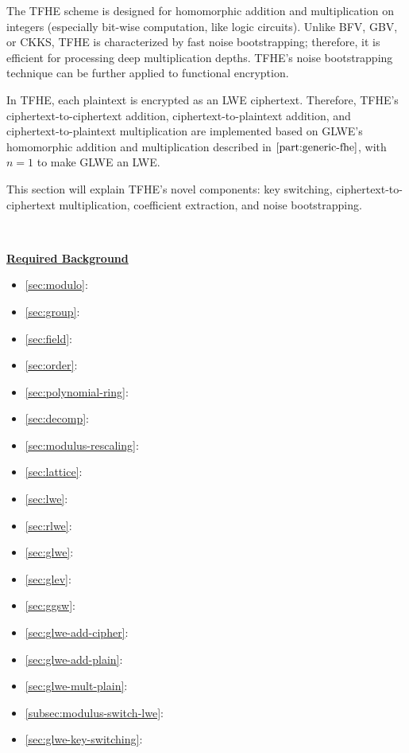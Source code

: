 
The TFHE scheme is designed for homomorphic addition and multiplication on integers (especially bit-wise computation, like logic circuits). Unlike BFV, GBV, or CKKS, TFHE is characterized by fast noise bootstrapping; therefore, it is efficient for processing deep multiplication depths. TFHE's noise bootstrapping technique can be further applied to functional encryption.

In TFHE, each plaintext is encrypted as an LWE ciphertext. Therefore, TFHE's ciphertext-to-ciphertext addition, ciphertext-to-plaintext addition, and ciphertext-to-plaintext multiplication are implemented based on GLWE's homomorphic addition and multiplication described in $\autoref{part:generic-fhe}$, with $n = 1$ to make GLWE an LWE.

This section will explain TFHE's novel components: key switching, ciphertext-to-ciphertext multiplication, coefficient extraction, and noise bootstrapping. 

$ $

\noindent \textbf{\underline{Required Background}}

\begin{itemize}
\item \autoref{sec:modulo}: 
\item \autoref{sec:group}: 
\item \autoref{sec:field}: 
\item \autoref{sec:order}: 
\item \autoref{sec:polynomial-ring}: 
\item \autoref{sec:decomp}: 
\item \autoref{sec:modulus-rescaling}: 
\item \autoref{sec:lattice}: 
\item \autoref{sec:lwe}: 
\item \autoref{sec:rlwe}: 
\item \autoref{sec:glwe}: 
\item \autoref{sec:glev}: 
\item \autoref{sec:ggsw}: 
\item \autoref{sec:glwe-add-cipher}: 
\item \autoref{sec:glwe-add-plain}: 
\item \autoref{sec:glwe-mult-plain}: 
\item \autoref{subsec:modulus-switch-lwe}: 
\item \autoref{sec:glwe-key-switching}: 
\end{itemize}



